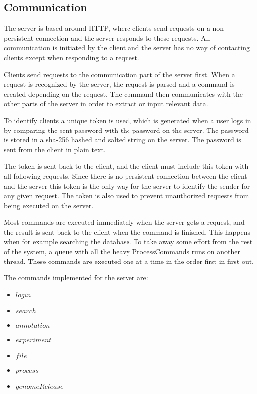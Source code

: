 \label{chap:com_systemdesign}
\subsection{Communication}
The server is based around HTTP, where clients send requests on a non-persistent connection and the server responds to these requests. All communication is initiated by the client and the server has no way of contacting clients except when responding to a request.

Clients send requests to the communication part of the server first. When a request is recognized by the server, the request is parsed and a command is created depending on the request. The command then communicates with the other parts of the server in order to extract or input relevant data.

To identify clients a unique token is used, which is generated when a user logs in by comparing the sent password with the password on the server. The password is stored in a sha-256 hashed and salted string on the server. The password is sent from the client in plain text.

The token is sent back to the client, and the client must include this token with all following requests. Since there is no persistent connection between the client and the server this token is the only way for the server to identify the sender for any given request. The token is also used to prevent unauthorized requests from being executed on the server.

Most commands are executed immediately when the server gets a request, and the result is sent back to the client when the command is finished. This happens when for example searching the database. To take away some effort from the rest of the system, a queue with all the heavy ProcessCommands runs on another thread. These commands are executed one at a time in the order first in first out.

The commands implemented for the server are:

\begin{itemize}
	\item $login$
	\item $search$
	\item $annotation$
	\item $experiment$
	\item $file$
	\item $process$
	\item $genomeRelease$
\end{itemize}

